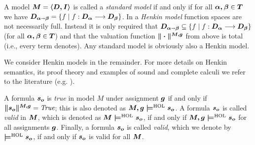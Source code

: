 \begin{defn}\label{homlhenkinmodel}
 A model $\boldsymbol{M}=\boldsymbol{\langle D, I \rangle}$ is called a
 \emph{standard model} if and only if for all $\boldsymbol{\alpha,\beta}\in \boldsymbol{T}$ we have
 $\boldsymbol{D_{\alpha\shortrightarrow\beta}} = \{ f \mid f : \boldsymbol{D_\alpha} \longrightarrow \boldsymbol{D_\beta}\}$. In a \emph{Henkin model} function spaces are not necessarily
 full. Instead it is only required that $\boldsymbol{D_{\alpha\shortrightarrow\beta}}
 \subseteq \{ f \mid f : \boldsymbol{D_\alpha} \longrightarrow \boldsymbol{D_\beta}\}$ (for all
 $\boldsymbol{\alpha,\beta}\in \boldsymbol{T}$) and that the valuation function 
 $\boldsymbol{\|\cdot\|^{M,g}}$ from above is total (i.e., every term denotes). Any standard model is obviously
 also a Henkin model. 
\end{defn}

We consider Henkin models in the remainder. For more details on Henkin
semantics, its proof theory and examples of sound and complete calculi
we refer to the literature (e.g. \cite{J6,J18}).

\begin{defn}[Validity]\label{homlvalid}
A formula $\boldsymbol{s_o}$ is \emph{true} in model $M$ 
under assignment $\boldsymbol{g}$ if and only if $\boldsymbol{\|s_o\|^{M,g}} = {\mathit{True}}$; this is also denoted
as $\boldsymbol{M,g \models^{\text{\textrm{HOL}}} s_o}$.  A formula $\boldsymbol{s_o}$ is called \emph{valid} in
$\boldsymbol{M}$, which is denoted as $\boldsymbol{M \models^{\text{\textrm{HOL}}} s_o}$, if and only if $\boldsymbol{M,g \models^{\text{\textrm{HOL}}} s_o}$ for all
assignments $\boldsymbol{g}$. Finally, a formula $\boldsymbol{s_o}$ is called
\emph{valid}, which we denote by $\boldsymbol{\models^{\text{\textrm{HOL}}} s_o}$, if and only if $\boldsymbol{s_o}$ is valid for
all $\boldsymbol{M}$. 
\end{defn}











